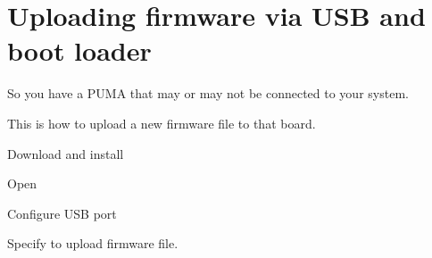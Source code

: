 \section{Uploading firmware via USB and boot loader}

So you have a PUMA that may or may not be connected to your system.

This is how to upload a new firmware file to that board.

Download and install 

Open

Configure USB port

Specify to upload firmware file.